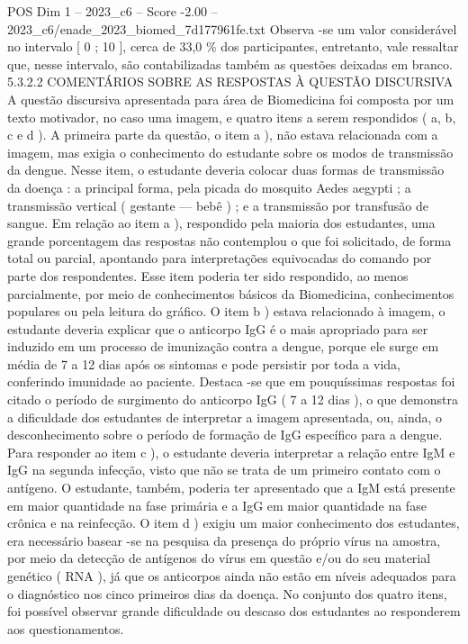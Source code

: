 \begin{textsample}{POS Dim 1 – 2023\_c6 – Score -2.00 – 2023\_c6/enade\_2023\_biomed\_7d177961fe.txt}
Observa -se um valor considerável no intervalo [ 0 ; 10 ], cerca de 33,0 \% dos participantes, entretanto, vale ressaltar que, nesse intervalo, são contabilizadas também as questões deixadas em branco. 5.3.2.2 COMENTÁRIOS SOBRE AS RESPOSTAS À QUESTÃO DISCURSIVA A questão discursiva apresentada para área de Biomedicina foi composta por um texto motivador, no caso uma imagem, e quatro itens a serem respondidos ( a, b, c e d ).
A primeira parte da questão, o item a ), não estava relacionada com a imagem, mas exigia o conhecimento do estudante sobre os modos de transmissão da dengue.
Nesse item, o estudante deveria colocar duas formas de transmissão da doença : a principal forma, pela picada do mosquito Aedes aegypti ; a transmissão vertical ( gestante — bebê ) ; e a transmissão por transfusão de sangue.
Em relação ao item a ), respondido pela maioria dos estudantes, uma grande porcentagem das respostas não contemplou o que foi solicitado, de forma total ou parcial, apontando para interpretações equivocadas do comando por parte dos respondentes.
Esse item poderia ter sido respondido, ao menos parcialmente, por meio de conhecimentos básicos da Biomedicina, conhecimentos populares ou pela leitura do gráfico.
O item b ) estava relacionado à imagem, o estudante deveria explicar que o anticorpo IgG é o mais apropriado para ser induzido em um processo de imunização contra a dengue, porque ele surge em média de 7 a 12 dias após os sintomas e pode persistir por toda a vida, conferindo imunidade ao paciente.
Destaca -se que em pouquíssimas respostas foi citado o período de surgimento do anticorpo IgG ( 7 a 12 dias ), o que demonstra a dificuldade dos estudantes de interpretar a imagem apresentada, ou, ainda, o desconhecimento sobre o período de formação de IgG específico para a dengue.
Para responder ao item c ), o estudante deveria interpretar a relação entre IgM e IgG na segunda infecção, visto que não se trata de um primeiro contato com o antígeno.
O estudante, também, poderia ter apresentado que a IgM está presente em maior quantidade na fase primária e a IgG em maior quantidade na fase crônica e na reinfecção.
O item d ) exigiu um maior conhecimento dos estudantes, era necessário basear -se na pesquisa da presença do próprio vírus na amostra, por meio da detecção de antígenos do vírus em questão e/ou do seu material genético ( RNA ), já que os anticorpos ainda não estão em níveis adequados para o diagnóstico nos cinco primeiros dias da doença.
No conjunto dos quatro itens, foi possível observar grande dificuldade ou descaso dos estudantes ao responderem aos questionamentos.

\end{textsample}
